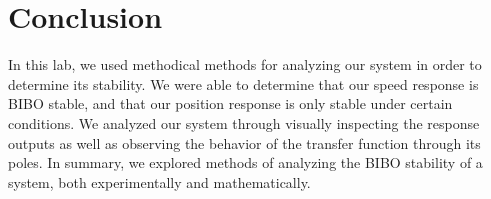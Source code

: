 \documentclass{article}
\begin{document}
\section{Conclusion}
In this lab, we used methodical methods for analyzing our system in order to determine its stability. We were able to determine that our speed response is BIBO stable, and that our position response is only stable under certain conditions. We analyzed our system through visually inspecting the response outputs as well as observing the behavior of the transfer function through its poles. In summary, we explored methods of analyzing the BIBO stability of a system, both experimentally and mathematically.
\end{document}
